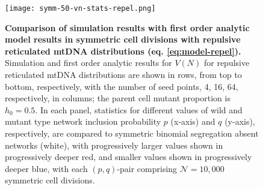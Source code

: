 \documentclass{article}
\begin{document}
\begin{appendices}
\begin{figure}[!ht]
        \centering \texttt{[image: symm-50-vn-stats-repel.png]}
        \caption{ \textbf{Comparison of simulation results with first order analytic model results in symmetric cell divisions with repulsive reticulated mtDNA distributions (eq. \ref{eq:model-repel}).} Simulation and first order analytic results for $V(N)$ for repulsive reticulated mtDNA distributions are shown in rows, from top to bottom, respectively, with the number of seed points, 4, 16, 64, respectively, in columns; the parent cell mutant proportion is $h_0=0.5$. In each panel, statistics for different values of wild and mutant type network inclusion probability $p$ (x-axis) and $q$ (y-axis), respectively, are compared to symmetric binomial segregation absent networks (white), with progressively larger values shown in progressively deeper red, and smaller values shown in progressively deeper blue, with each $(p,q)$-pair comprising $\mathcal{N}=10,000$ symmetric cell divisions.}\label{fig:app-vn-stats-repel}
\end{figure}

\end{appendices}
\end{document}

